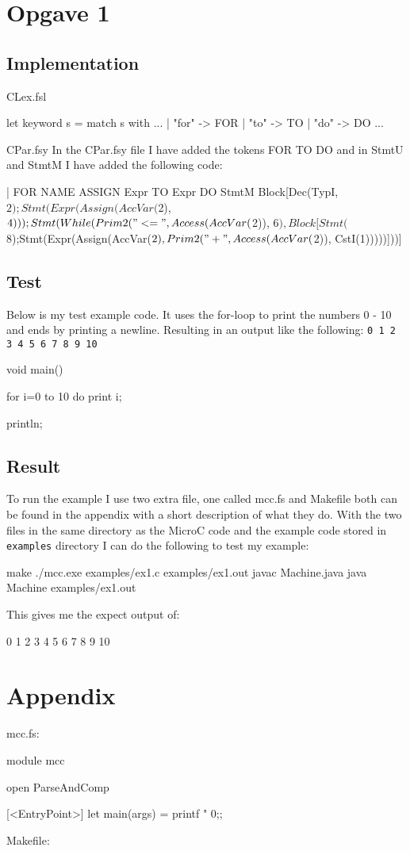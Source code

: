 \section{Opgave 1}
\subsection{Implementation}
CLex.fsl
\begin{fs}
let keyword s =
    match s with
    ...
    | "for"     -> FOR
    | "to"      -> TO
    | "do"      -> DO
    ...
\end{fs}
CPar.fsy
In the CPar.fsy file I have added the tokens FOR TO DO and in StmtU and StmtM I
have added the following code:
\begin{fs}
  | FOR NAME ASSIGN Expr TO Expr DO StmtM { Block[Dec(TypI, $2); Stmt(Expr(Assign(AccVar($2), $4))); Stmt(While(Prim2("<=", Access(AccVar($2)), $6), Block[Stmt($8);Stmt(Expr(Assign(AccVar($2), Prim2("+", Access(AccVar($2)), CstI(1)))))]))] }
\end{fs}
\subsection{Test}
Below is my test example code. It uses the for-loop to print the numbers 0 - 10
and ends by printing a newline. Resulting in an output like the following:
\texttt{0 1 2 3 4 5 6 7 8 9 10}
\begin{ccode}
void main() {
  for i=0 to 10 do 
    print i;

  println;
}
\end{ccode}
\subsection{Result}
To run the example I use two extra file, one called mcc.fs and Makefile both can
be found in the appendix with a short description of what they do. With the two
files in the same directory as the MicroC code and the example code stored in
\texttt{examples} directory I can do the following to test my example:
\begin{bashcode}
make
./mcc.exe examples/ex1.c examples/ex1.out
javac Machine.java
java Machine examples/ex1.out
\end{bashcode}
This gives me the expect output of:
\begin{bashcode}
0 1 2 3 4 5 6 7 8 9 10

\end{bashcode}

\pagebreak
\section{Appendix}
mcc.fs:
\begin{fs}
module mcc

open ParseAndComp

[<EntryPoint>]
let main(args) =
    printf "%
    0;;
\end{fs}
Makefile:

